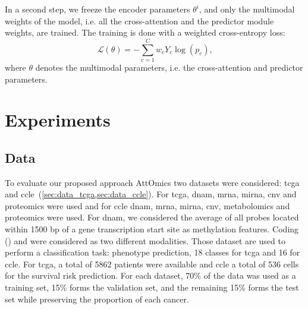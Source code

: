 \documentclass[../main.tex]{subfiles}
\begin{document}
		In a second step, we freeze the encoder parameters \(\theta^i\), and only the multimodal weights of the model, i.e. all the cross-attention and the predictor module weights, are trained.
		The training is done with a weighted cross-entropy loss:
		\begin{equation*}
			\mathcal{L}(\theta) = - \sum_{c=1}^{C}w_c Y_c \log\left( p_c\right) \text{,}
		\end{equation*}
		where \(\theta\) denotes the multimodal parameters, i.e. the cross-attention and predictor parameters.

\section{Experiments}
	\subsection{Data}
		To evaluate our proposed approach AttOmics two datasets were considered: \gls{tcga} and \gls{ccle}~(\cref{sec:data_tcga,sec:data_ccle}).
		For \gls{tcga}, \Gls{dnam}, \gls{mrna}, \gls{mirna}, \gls{cnv} and proteomics were used and for \gls{ccle} \gls{dnam}, \gls{mrna}, \gls{mirna}, \gls{cnv}, metabolomics and proteomics were used.
		For \gls{dnam}, we considered the average of all probes located within 1500 bp of a gene transcription start site as methylation features.
		Coding () and  were considered as two different modalities.
		Those dataset are used to perform a classification task: phenotype prediction, 18 classes for \gls{tcga} and 16 for \gls{ccle}.
		For \gls{tcga}, a total of 5862 patients were available and \gls{ccle} a total of 536 cells for the survival risk prediction.
		For each dataset, 70\% of the data was used as a training set, 15\% forms the validation set, and the remaining 15\% forms the test set while preserving the proportion of each cancer.
\end{document}
